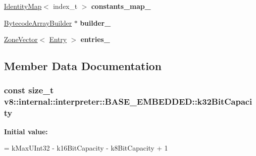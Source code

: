 \begin{DoxyCompactItemize}
\item 
\hyperlink{classv8_1_1internal_1_1_identity_map}{Identity\+Map}$<$ index\+\_\+t $>$ {\bfseries constants\+\_\+map\+\_\+}\hypertarget{classv8_1_1internal_1_1interpreter_1_1_b_a_s_e___e_m_b_e_d_d_e_d_ae9df3dec970a0cd7d15adae997dc87a3}{}\label{classv8_1_1internal_1_1interpreter_1_1_b_a_s_e___e_m_b_e_d_d_e_d_ae9df3dec970a0cd7d15adae997dc87a3}

\item 
\hyperlink{classv8_1_1internal_1_1interpreter_1_1_bytecode_array_builder}{Bytecode\+Array\+Builder} $\ast$ {\bfseries builder\+\_\+}\hypertarget{classv8_1_1internal_1_1interpreter_1_1_b_a_s_e___e_m_b_e_d_d_e_d_a60ef7ea3ffcace4eb02c14391c20c3da}{}\label{classv8_1_1internal_1_1interpreter_1_1_b_a_s_e___e_m_b_e_d_d_e_d_a60ef7ea3ffcace4eb02c14391c20c3da}

\item 
\hyperlink{classv8_1_1internal_1_1_zone_vector}{Zone\+Vector}$<$ \hyperlink{structv8_1_1internal_1_1interpreter_1_1_b_a_s_e___e_m_b_e_d_d_e_d_1_1_entry}{Entry} $>$ {\bfseries entries\+\_\+}\hypertarget{classv8_1_1internal_1_1interpreter_1_1_b_a_s_e___e_m_b_e_d_d_e_d_a6a2721f069f66b4c3681144e79ddd4b0}{}\label{classv8_1_1internal_1_1interpreter_1_1_b_a_s_e___e_m_b_e_d_d_e_d_a6a2721f069f66b4c3681144e79ddd4b0}

\end{DoxyCompactItemize}


\subsection{Member Data Documentation}
\subsubsection[{\texorpdfstring{k32\+Bit\+Capacity}{k32BitCapacity}}]{\setlength{\rightskip}{0pt plus 5cm}const size\+\_\+t v8\+::internal\+::interpreter\+::\+B\+A\+S\+E\+\_\+\+E\+M\+B\+E\+D\+D\+E\+D\+::k32\+Bit\+Capacity\hspace{0.3cm}{\ttfamily [static]}}\hypertarget{classv8_1_1internal_1_1interpreter_1_1_b_a_s_e___e_m_b_e_d_d_e_d_a7b2daf07f2c75512b28f3e35f5b771d8}{}\label{classv8_1_1internal_1_1interpreter_1_1_b_a_s_e___e_m_b_e_d_d_e_d_a7b2daf07f2c75512b28f3e35f5b771d8}
{\bfseries Initial value\+:}
\begin{DoxyCode}
=
      kMaxUInt32 - k16BitCapacity - k8BitCapacity + 1
\end{DoxyCode}


